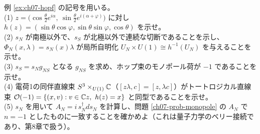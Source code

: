 \begin{problem}[難易度 B]\label{ch07-prob-hopf}
例 \ref{ex:ch07-hopf} の記号を用いる。\\
(1) $z=\bigl(\cos\tfrac\theta2e^{i\alpha},\ \sin\tfrac\theta2e^{i(\alpha+\varphi)}\bigr)$ に対し $h(z)=(\sin\theta\cos\varphi,\sin\theta\sin\varphi,\cos\theta)$ を示せ。\\
(2) $s_N$ が南極以外で、$s_S$ が北極以外で連続な切断であることを示し、$\Phi_N(x,\lambda)=s_N(x)\lambda$ が局所自明化 $U_N\times U(1)\cong h^{-1}(U_N)$ を与えることを示せ。\\
(3) $s_S=s_Ng_{NS}$ となる $g_{NS}$ を求め、ホップ束のモノポール荷が $-1$ であることを示せ。\\
(4) 電荷1の同伴直線束 $S^3\times_{U(1)}\mathbb{C}$（$[z\lambda,c]=[z,\lambda c]$）がトートロジカル直線束 $\mathcal O(-1)=\{(x,v):v\in\C z,\ h(z)=x\}$ と同型であることを示せ。\\
(5) $s_N$ を用いて $A_N=i\,s_N^\dagger ds_N$ を計算し、問題 \ref{ch07-prob-monopole} の $A_N$ で $n=-1$ としたものに一致することを確かめよ（これは量子力学のベリー接続であり、第8章で扱う）。
\end{problem}


